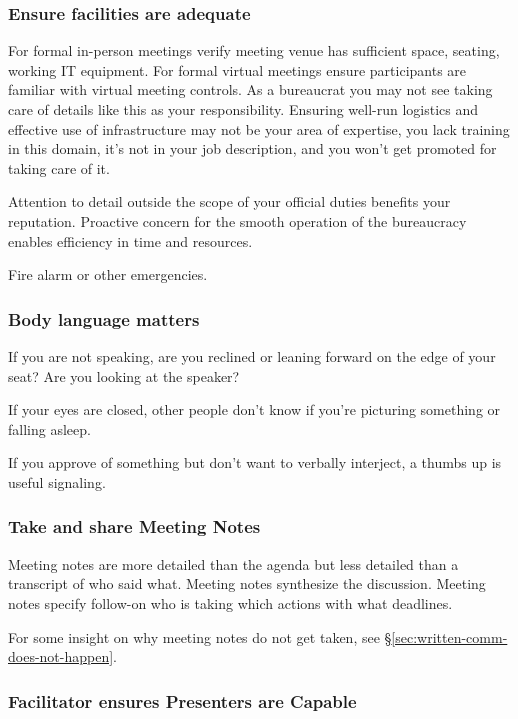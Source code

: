 \subsubsection{Ensure facilities are adequate}
For formal in-person meetings verify meeting venue has sufficient space, seating, working IT equipment. For formal virtual meetings ensure participants are familiar with virtual meeting controls. 
As a bureaucrat you may not see taking care of details like this as your responsibility. Ensuring well-run logistics and effective use of infrastructure may not be your area of expertise, you lack training in this domain, it's not in your job description, and you won't get promoted for taking care of it. 

Attention to detail outside the scope of your official duties benefits your reputation. Proactive concern for the smooth operation of the bureaucracy enables efficiency in time and resources.


Fire alarm or other emergencies. 

\subsubsection{Body language matters}

If you are not speaking, are you reclined or leaning forward on the edge of your seat? Are you looking at the speaker?

If your eyes are closed, other people don't know if you're picturing something or falling asleep. 

If you approve of something but don't want to verbally interject, a thumbs up is useful signaling. 

\subsubsection{Take and share Meeting Notes}

Meeting notes are more detailed than the agenda but less detailed than a transcript of who said what. Meeting notes synthesize the discussion. Meeting notes specify follow-on who is taking which actions with what deadlines. 

For some insight on why meeting notes do not get taken, see \S\ref{sec:written-comm-does-not-happen}. 

\subsubsection{Facilitator ensures Presenters are Capable}

